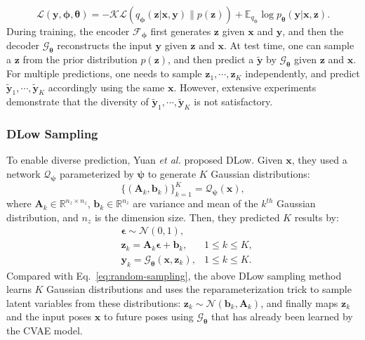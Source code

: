 \documentclass[sigconf,screen,nonacm]{acmart}
\begin{document}
	\begin{equation}
		\label{eq:elbo-loss}
		\mathcal{L}(\mathbf{y}, \bm{\phi}, \bm{\theta}) = -\mathcal{KL}\left(q_{\bm{\phi}}(\mathbf{z}|\mathbf{x},\mathbf{y})\| p(\mathbf{z})\right) + \mathbb{E}_{q_{\bm{\phi}}} \log p_{\bm{\theta}}(\mathbf{y}|\mathbf{x},\mathbf{z}).
	\end{equation}
	During training, the encoder $\mathcal{F}_{\bm{\phi}}$ first generates $\mathbf{z}$ given $\mathbf{x}$ and $\mathbf{y}$, and then the decoder $\mathcal{G}_{\bm{\theta}}$ reconstructs the input $\mathbf{y}$ given $\mathbf{z}$ and $\mathbf{x}$. 
At test time, one can sample a $\mathbf{z}$ from the prior distribution $p(\mathbf{z})$, and then predict a $\mathbf{\tilde{y}}$ by $\mathcal{G}_{\bm{\theta}}$ given $\mathbf{z}$ and $\mathbf{x}$. For multiple predictions, one needs to sample $\mathbf{z}_1,\cdots,\mathbf{z}_K$ independently, and predict $\mathbf{\tilde{y}}_1,\cdots,\mathbf{\tilde{y}}_K$ accordingly using the same $\mathbf{x}$. However, extensive experiments demonstrate that the diversity of $\mathbf{\tilde{y}}_1,\cdots,\mathbf{\tilde{y}}_K$ is not satisfactory. 

	
	\subsubsection{DLow Sampling}
	To enable diverse prediction, Yuan \textit{et al.} \cite{yuan2020dlow} proposed DLow. Given $\mathbf{x}$, they used a network $\mathcal{Q}_{\bm{\psi}}$ parameterized by $\bm{\psi}$ to generate $K$ Gaussian distributions: 
	\begin{equation}
		\{(\mathbf{A}_k,\mathbf{b}_k)\}_{k=1}^{K} = \mathcal{Q}_{\bm{\psi}}(\mathbf{x}),
	\end{equation}
	where $\mathbf{A}_k\in \mathbb{R}^{n_z\times n_z}$, $\mathbf{b}_k \in \mathbb{R}^{n_z}$ are variance and mean of the $k^{th}$ Gaussian distribution, and $n_z$ is the dimension size. Then, they predicted $K$ results by:
	\begin{equation}
		\label{eq:dlow-sampling}
		\begin{aligned}
			&\bm{\epsilon}  \sim \mathcal{N}(0,1),\\ &\mathbf{z}_k  = \mathbf{A}_k \mathbf{\bm{\epsilon}} + \mathbf{b}_k, &1\leq k \leq K,\\
			&\mathbf{y}_k  = \mathcal{G}_{\bm{\theta}}(\mathbf{x},\mathbf{z}_k), &1\leq k \leq K.
		\end{aligned}
	\end{equation}
	Compared with Eq.~\ref{eq:random-sampling}, the above DLow sampling method learns $K$ Gaussian distributions and uses the reparameterization trick to sample latent variables from these distributions: $\mathbf{z}_k \sim \mathcal{N}(\mathbf{b}_k, \mathbf{A}_k)$, and finally maps $\mathbf{z}_k$ and the input poses $\mathbf{x}$ to future poses using $\mathcal{G}_{\bm{\theta}}$ that has already been learned by the CVAE model.
	
\end{document}
